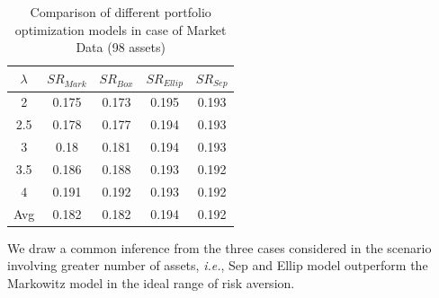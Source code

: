 \begin{table}[!h]
    \centering
    \captionsetup{justification=centering}
   \begin{tabular}{||c|c|c|c|c||}
   \hline
  
  
  $\lambda$ & $SR_{Mark}$ & $SR_{Box}$ & $SR_{Ellip}$ & $SR_{Sep}$ \\
  
  \hline
2 & 0.175 & 0.173 & 0.195 & 0.193 \\
2.5 & 0.178 & 0.177 & 0.194 & 0.193 \\
3 & 0.18 & 0.181 & 0.194 & 0.193 \\
3.5 & 0.186 & 0.188 & 0.193 & 0.192 \\
4 & 0.191 & 0.192 & 0.193 & 0.192 \\
  \hline
  Avg & 0.182 & 0.182 & 0.194 & 0.192 \\
  \hline

\end{tabular}
    \caption{Comparison of different portfolio optimization models in case of Market Data (98 assets)}
    \label{tab:6}
\end{table} 

We draw a common inference from the three cases considered in the scenario involving greater number of assets, \textit{i.e.}, Sep and Ellip model outperform the Markowitz model in the ideal range of risk aversion.







